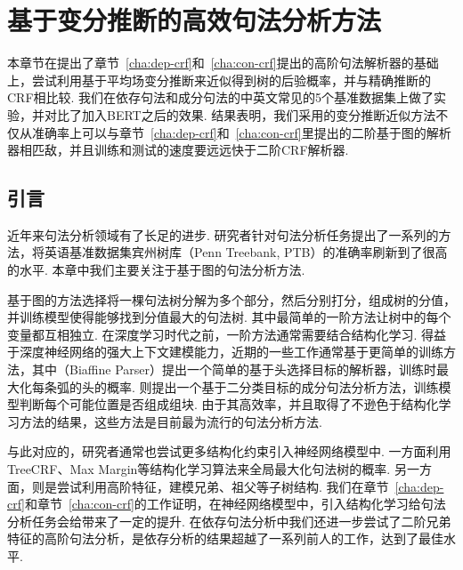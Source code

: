 \chapter{基于变分推断的高效句法分析方法}
\label{cha:approximate-vi}

本章节在提出了章节~\ref{cha:dep-crf}和~\ref{cha:con-crf}提出的高阶句法解析器的基础上，尝试利用基于平均场变分推断来近似得到树的后验概率，并与精确推断的CRF相比较.
我们在依存句法和成分句法的中英文常见的5个基准数据集上做了实验，并对比了加入BERT之后的效果.
结果表明，我们采用的变分推断近似方法不仅从准确率上可以与章节~\ref{cha:dep-crf}和~\ref{cha:con-crf}里提出的二阶基于图的解析器相匹敌，并且训练和测试的速度要远远快于二阶CRF解析器.

\section{引言}\label{sec:vi-intro}
近年来句法分析领域有了长足的进步.
研究者针对句法分析任务提出了一系列的方法\citep{dozat-etal-2017-biaffine,gomez-rodriguez-vilares-2018-constituent,ji-etal-2019-graph,zhang-etal-2020-fast,wei-etal-2020-span}，将英语基准数据集宾州树库（Penn Treebank, PTB）的准确率刷新到了很高的水平.
本章中我们主要关注于基于图的句法分析方法.

基于图的方法选择将一棵句法树分解为多个部分，然后分别打分，组成树的分值，并训练模型使得能够找到分值最大的句法树.
其中最简单的一阶方法让树中的每个变量都互相独立.
在深度学习时代之前，一阶方法通常需要结合结构化学习\citep{mcdonald-etal-2005-online,koo-etal-2007-structured,taskar-etal-2004-max}.
得益于深度神经网络的强大上下文建模能力，近期的一些工作通常基于更简单的训练方法，其中\citet{dozat-etal-2017-biaffine}（Biaffine Parser）提出一个简单的基于头选择目标的解析器，训练时最大化每条弧的头的概率.
\citet{gaddy-etal-2018-whats}则提出一个基于二分类目标的成分句法分析方法，训练模型判断每个可能位置是否组成组块.
由于其高效率，并且取得了不逊色于结构化学习方法的结果\citep{zhang-etal-2019-empirical,falenska-kuhn-2019-non}，这些方法是目前最为流行的句法分析方法.

与此对应的，研究者通常也尝试更多结构化约束引入神经网络模型中.
一方面利用TreeCRF、Max Margin\citep{ma-hovy-2017-neural,falenska-kuhn-2019-non,stern-etal-2017-minimal}等结构化学习算法来全局最大化句法树的概率.
另一方面，则是尝试利用高阶特征，建模兄弟、祖父等子树结构\citep{mcdonald-pereira-2006-online,koo-collins-2010-efficient}.
我们在章节~\ref{cha:dep-crf}和章节~\ref{cha:con-crf}的工作证明，在神经网络模型中，引入结构化学习给句法分析任务会给带来了一定的提升.
在依存句法分析中我们还进一步尝试了二阶兄弟特征的高阶句法分析，是依存分析的结果超越了一系列前人的工作，达到了最佳水平.

